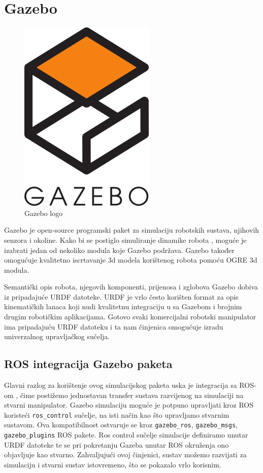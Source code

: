 \documentclass[times, utf8, diplomski, numeric]{fer}
\begin{document}
\section{Gazebo}
\begin{figure}[h!]
\centering
\includegraphics[scale=0.5]{gazebo_1}
\caption{Gazebo logo}
\end{figure}
Gazebo je open-source programski paket za simulaciju robotskih sustava, njihovih senzora i okoline.
Kako bi se postiglo simuliranje dinamike robota , moguće je izabrati jedan od nekoliko modula koje Gazebo podržava.
Gazebo također omogućuje kvalitetno iscrtavanje 3d modela korištenog robota pomoću OGRE 3d modula.

Semantički opis robota, njegovih komponenti, prijenosa i zglobova Gazebo dobiva iz pripadajuće URDF datoteke.
URDF je vrlo često korišten format za opis kinematičkih lanaca koji nudi kvalitetnu integraciju u sa Gazebom i brojnim drugim robotičkim aplikacijama.
Gotovo svaki komercijalni robotski manipulator ima pripadajuću URDF datoteku i ta nam činjenica omogućuje izradu univerzalnog upravljačkog sučelja.


\subsection{ROS integracija Gazebo paketa}
Glavni razlog za korištenje ovog simulacijskog paketa uska je integracija sa ROS-om , čime postižemo jednostavan transfer sustava razvijenog na simulaciji na stvarni manipulator.
Gazebo simulaciju moguće je potpuno upravljati kroz ROS koristeći \verb|ros_control| sučelje, na isti način kao što upravljamo stvarnim sustavom.
Ova kompatibilnost ostvaruje se kroz \verb|gazebo_ros|, \verb|gazebo_msgs|, \verb|gazebo_plugins|  ROS pakete.
Ros control sučelje simulacije definiramo unutar URDF datoteke te se pri pokretanju Gazeba unutar ROS okruženja ono objavljuje kao stvarno.
Zahvaljujući ovoj činjenici, sustav možemo razvijati za simulaciju i stvarni sustav istovremeno, što se pokazalo vrlo korisnim.
\end{document}
